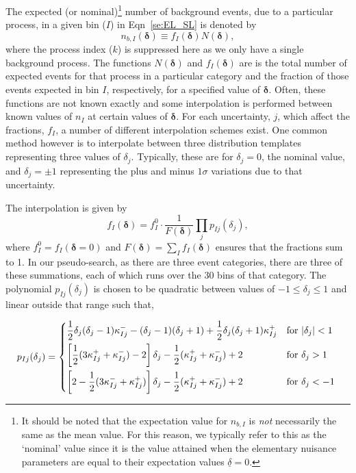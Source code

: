 \documentclass[11pt]{article}
\begin{document}
The expected (or nominal)\footnote{It should be noted that the expectation value for $n_{b,I}$ is \emph{not} necessarily the same as the mean value. For this reason, we typically refer
to this as the `nominal' value since it is the value attained when the elementary nuisance parameters are equal to their expectation values $\underline{\delta}=0$.} number of background events, due to a particular process, in a given bin ($I$) in Eqn~\ref{se:EL_SL} is denoted by
%
\begin{equation}
  n_{b,I}(\bm{\delta}) \equiv %
  f_{I}(\bm{\delta}) N(\bm{\delta}),
\end{equation}
%
where the process index ($k$) is suppressed here as we only have a single background process. The functions $N(\bm{\delta})$ and  $f_{I}(\bm{\delta})$ are is the total number of expected events for that process in a particular
category and the fraction of those events expected in bin $I$, respectively, for a specified value of $\bm{\delta}$. Often, these functions are not known exactly and some interpolation is performed between known
values of $n_{I}$ at certain values of $\bm{\delta}$. For each uncertainty, $j$, which affect the fractions, $f_{I}$, a number of different interpolation schemes exist. One common method however is to interpolate between
three distribution templates representing three values of $\delta_{j}$. Typically, these are for $\delta_{j}=0$, the nominal value, and $\delta_{j}=\pm1$ representing the plus and minus $1\sigma$ variations due to that uncertainty.

The interpolation is given by
%
\begin{equation}
 f_{I}(\bm{\delta}) = f_{I}^{0}\cdot\frac{1}{F(\bm{\delta})} \prod_{j} p_{Ij}(\delta_{j}),
 \label{eqn:frac_function}
\end{equation}
%
where $f_{I}^{0}=f_{I}(\bm{\delta}=0)$ and $F(\bm{\delta})=\sum_{I}f_{I}(\bm{\delta})$ ensures that the fractions sum to 1. In our pseudo-search, as there are three event categories,
there are three of these summations, each of which runs over the 30 bins of that category. The polynomial $p_{Ij}(\delta_{j})$ is chosen to be quadratic between values of $-1 \leq \delta_{j} \leq 1$
and linear outside that range such that,

\begin{equation}
 p_{Ij}(\delta_{j}) = \begin{dcases*}
 		\frac{1}{2} \delta_{j}(\delta_{j}-1) \kappa_{Ij}^{-}  -(\delta_{j}-1)(\delta_{j}+1) + \frac{1}{2}\delta_{j}(\delta_{j}+1)\kappa_{Ij}^{+} & for $|\delta_{j}|<1$ \\
        \left[ \frac{1}{2}(3\kappa_{Ij}^{+} + \kappa_{Ij}^{-})-2\right]\delta_{j} - \frac{1}{2}(\kappa_{Ij}^{+}+\kappa_{Ij}^{-})+2 & for $\delta_{j}>1$ \\
         \left[2-\frac{1}{2}(3\kappa_{Ij}^{-} + \kappa_{Ij}^{+})\right]\delta_{j} - \frac{1}{2}(\kappa_{Ij}^{+}+\kappa_{Ij}^{-})+2 & for $\delta_{j}<-1$ \\
    \end{dcases*}
\end{equation}
\end{document}
